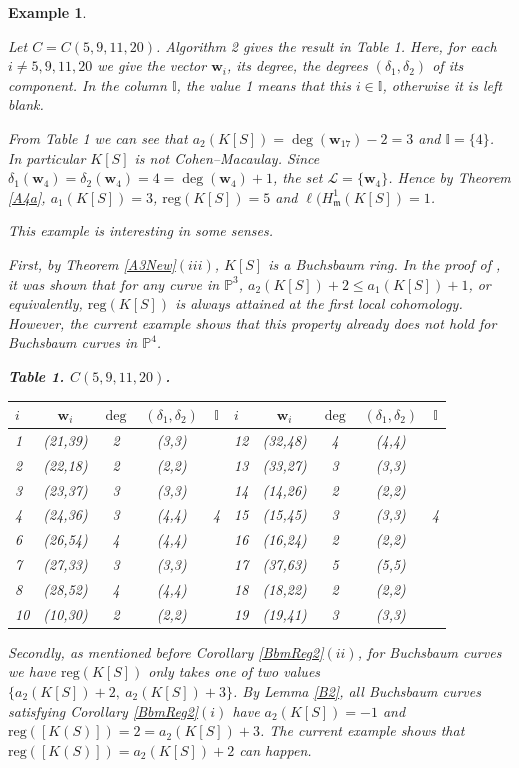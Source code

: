 \documentclass[11pt]{article}
\newtheorem{Example}[Theorem]{Example}
\def\deg{\operatorname{deg}}
\def\reg{\mathrm{reg}}
\def\mfr{{\frak m}}
\def\wbf{{\mathbf w}}
\def\mfr{{\mathfrak m}}
\def\Lcal{{\mathcal L}}
\def\Pset{{\mathbb P}}
\def\Iset{{\mathbb I}}
\theoremstyle{remark}
\theoremstyle{definition}
\begin{document}
\begin{Example} \label{ExAl1} {\rm
Let $C= C(5,9,11,20)$. Algorithm 2 gives the result in Table 1. Here, for each $i \neq 5,9,11,20$ we give the vector $\wbf_i$, its degree, the degrees $(\delta_1,\delta_2)$ of its component. In the column $\Iset$, the value 1 means that this $i\in \Iset$, otherwise it is left blank.

From Table 1 we can see that $a_2(K[S]) = \deg(\wbf_{17}) - 2 = 3$ and $\Iset = \{ 4\}$. In particular $K[S]$ is not Cohen--Macaulay. Since $\delta_1(\wbf_4) = \delta_2(\wbf_4) = 4 = \deg(\wbf_4) + 1$, the set $ \Lcal = \{\wbf_4\}$. Hence by Theorem \ref{A4a}, $a_1(K[S]) = 3$,  $\reg(K[S]) = 5$ and $\ell(H^1_{\mfr}(K[S]) = 1$.

This example is interesting in some senses. 

First, by Theorem \ref{A3New}\((iii)\), $K[S]$ is a Buchsbaum ring. In the proof of  \cite[Theorem 4.1]{BCFH}, it was shown that for any curve in $\Pset^3$, $a_2(K[S]) + 2 \leq a_1(K[S]) + 1$, or equivalently, $\reg(K[S])$ is always attained at the first local cohomology. However, the current example shows that this property already  does not hold  for Buchsbaum curves in $\Pset^4$.

\centering \textbf{Table 1. $C(5,9,11,20)$.}
\begin{center}
    \begin{tabular}{|l|c|c|c|c|| l|c|c|c|c|}
\hline
$i$ & $ \wbf_i$ & $\deg$ & $(\delta_1,\delta_2)$ & $\Iset $ & $i$ & $ \wbf_i$ & $\deg$ & $(\delta_1,\delta_2)$ & $\Iset $ \\
\hline
1& (21,39) & 2 &(3,3)&  & 12& (32,48) & 4 & (4,4)&  \\
2 & (22,18) & 2 & (2,2)&  &13& (33,27)& 3& (3,3) & \\
3 & (23,37) & 3& (3,3) &  &14& (14,26) & 2& (2,2)& \\
4 &(24,36)& 3 &(4,4)&  4 &15& (15,45)& 3&(3,3) & 4\\
6 & (26,54) &4& (4,4)& & 16 &(16,24)& 2&(2,2)& \\
7& (27,33)& 3& (3,3) &  & 17 & (37,63)& 5& (5,5) & \\
8 & (28,52)& 4& (4,4) &  & 18&(18,22)& 2& (2,2) & \\
10& (10,30)& 2& (2,2)&  & 19& (19,41)& 3 & (3,3)& \\
\hline
\end{tabular}
\end{center}

Secondly, as mentioned before Corollary \ref{BbmReg2}\((ii)\), for Buchsbaum curves we have $\reg(K[S])$ only takes one of two values $\{a_2(K[S]) + 2,\ a_2(K[S]) + 3 \}$. By Lemma \ref{B2}, all Buchsbaum curves satisfying Corollary \ref{BbmReg2}\((i)\) have $a_2(K[S]) = -1$ and $\reg([K(S)]) = 2 = a_2(K[S]) + 3$. The current example shows that $\reg([K(S)]) = a_2(K[S]) + 2$ can happen.
} 
\end{Example}
\end{document}
